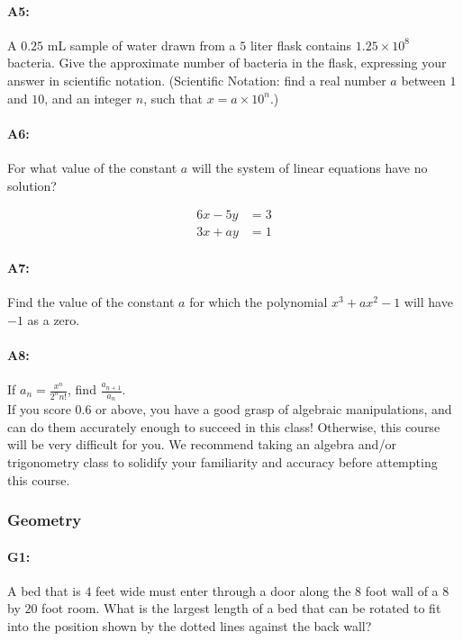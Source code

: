 \documentclass[pdftex, brazil, 12pt, twoside]{article}
\begin{document}
\paragraph{A5:} A $0.25$ mL sample of water drawn from a $5$ liter flask contains $1.25 \times 10^8$ bacteria. Give the
approximate number of bacteria in the flask, expressing your answer in scientific notation.
(Scientific Notation: find a real number $a$
between $1$ and $10$, and an integer $n$, such that $x = a \times 10^n$.)

\paragraph{A6:} For what value of the constant $a$ will the system of linear equations have no solution?

\begin{equation}
  \begin{split}
    6x - 5y &= 3\\
    3x + ay &= 1
  \end{split}
\end{equation}

\paragraph{A7:} Find the value of the constant $a$ for which the polynomial $x^3 + ax^2 -1$ will have $-1$ as a zero.

\paragraph{A8:} If $\displaystyle a_n = \frac{x^n}{2^nn!}$, find $\displaystyle \frac{a_{n+1}}{a_n}$.
\ \\

If you score $0.6$ or above, you have a good grasp of algebraic manipulations, and can do them accurately enough to succeed in this class!
Otherwise, this course will be very difficult for you. We recommend taking an algebra and/or trigonometry class to solidify your familiarity and accuracy before attempting this course.

\subsubsection{Geometry}
\label{gs-adventure-geometry}

\paragraph{G1:} A bed that is $4$ feet wide must enter through a door along the $8$ foot wall of a $8$ by $20$ foot room.
What is the largest length of a bed that can be rotated to fit into the position shown by the dotted lines against the back wall?
\end{document}
